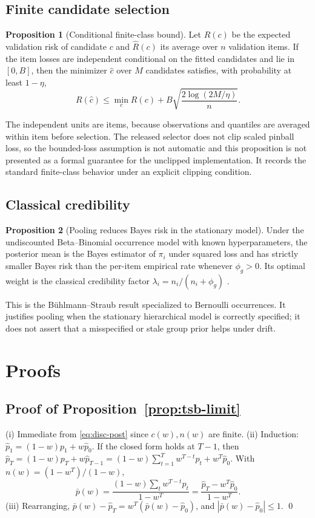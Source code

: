 \documentclass[twoside]{article}
\theoremstyle{definition}
\newtheorem{proposition}{Proposition}
\begin{document}
\subsection{Finite candidate selection}

\begin{proposition}[Conditional finite-class bound]
\label{prop:oracle}
Let $R(c)$ be the expected validation risk of candidate $c$ and
$\hat R(c)$ its average over $n$ validation items. If the item losses are
independent conditional on the fitted candidates and lie in $[0,B]$, then
the minimizer $\hat c$ over $M$ candidates satisfies, with probability at
least $1-\eta$,
\[
R(\hat c)\le\min_cR(c)+B\sqrt{\frac{2\log(2M/\eta)}{n}}.
\]
\end{proposition}

The independent units are items, because observations and quantiles are
averaged within item before selection. The released selector does not
clip scaled pinball loss, so the bounded-loss assumption is not automatic
and this proposition is not presented as a formal guarantee for the
unclipped implementation. It records the standard finite-class behavior
under an explicit clipping condition.

\subsection{Classical credibility}

\begin{proposition}[Pooling reduces Bayes risk in the stationary model]
\label{prop:credibility}
Under the undiscounted Beta--Binomial occurrence model with known
hyperparameters, the posterior mean is the Bayes estimator of $\pi_i$
under squared loss and has strictly smaller Bayes risk than the per-item
empirical rate whenever $\phi_g>0$. Its optimal weight is the classical
credibility factor $\lambda_i=n_i/(n_i+\phi_g)$
\citep{buhlmann1967}.
\end{proposition}

This is the B\"uhlmann--Straub result specialized to Bernoulli
occurrences. It justifies pooling when the stationary hierarchical model
is correctly specified; it does not assert that a misspecified or stale
group prior helps under drift.

\section{Proofs}\label{app:proofs}

\subsection{Proof of Proposition~\ref{prop:tsb-limit}}
(i) Immediate from \eqref{eq:disc-post} since $c(w),n(w)$ are finite.
(ii) Induction: $\hat p_1=(1-w)p_1+w\hat p_0$. If the closed form holds at
$T-1$, then
$\hat p_T=(1-w)p_T+w\hat p_{T-1}=(1-w)\sum_{t=1}^{T}w^{T-t}p_t+w^{T}\hat p_0$.
With $n(w)=(1-w^{T})/(1-w)$,
\[
\bar p(w)=\frac{(1-w)\sum_t w^{T-t}p_t}{1-w^{T}}
=\frac{\hat p_T-w^{T}\hat p_0}{1-w^{T}}.
\]
(iii) Rearranging, $\bar p(w)-\hat p_T=w^{T}(\bar p(w)-\hat p_0)$, and
$|\bar p(w)-\hat p_0|\le1$. \qed
\end{document}
